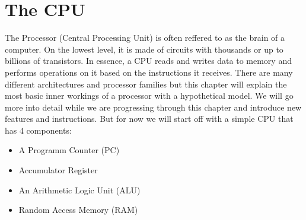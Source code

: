 \section{The CPU}

The Processor (Central Processing Unit) is often reffered to as the brain of a computer. On the
lowest level, it is made of circuits with thousands or up to billions of transistors. In
essence, a CPU reads and writes data to memory and performs operations on it based on the
instructions it receives. There are many different architectures and processor families but
this chapter will explain the most basic inner workings of a processor with a hypothetical
model. We will go more into detail while we are progressing through this chapter and introduce new 
features and instructions. But for now we will start off with a simple CPU that has 4 components:

\begin{itemize}
	\item A Programm Counter (PC)
	\item Accumulator Register
	\item An Arithmetic Logic Unit (ALU)
	\item Random Access Memory (RAM)
\end{itemize}

